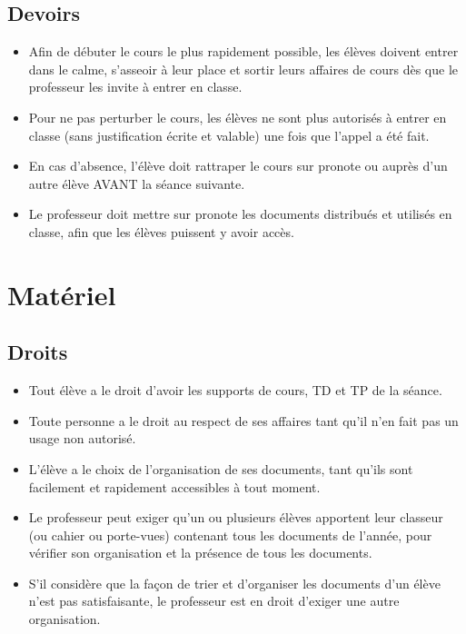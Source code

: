 \documentclass[10pt,fleqn]{article} %
\begin{document}
\subsection{Devoirs}
\begin{itemize}
    \item Afin de débuter le cours le plus rapidement possible, les élèves doivent entrer dans le calme, s'asseoir à leur place et sortir leurs affaires de cours dès que le professeur les invite à entrer en classe. 
    \item Pour ne pas perturber le cours, les élèves ne sont plus autorisés à entrer en classe (sans justification écrite et valable) une fois que l'appel a été fait. 
    \item En cas d'absence, l'élève doit rattraper le cours sur pronote ou auprès d'un autre élève AVANT la séance suivante. 
    \item Le professeur doit mettre sur pronote les documents distribués et utilisés en classe, afin que les élèves puissent y avoir accès. 
\end{itemize}

\section{Matériel}
\subsection{Droits}
\begin{itemize}
    \item Tout élève a le droit d'avoir les supports de cours, TD et TP de la séance. 
    \item Toute personne a le droit au respect de ses affaires tant qu'il n'en fait pas un usage non autorisé.
    \item L'élève a le choix de l'organisation de ses documents, tant qu'ils sont facilement et rapidement accessibles à tout moment. 
    \item Le professeur peut exiger qu'un ou plusieurs élèves apportent leur classeur (ou cahier ou porte-vues) contenant tous les documents de l'année, pour vérifier son organisation et la présence de tous les documents. 
    \item S'il considère que la façon de trier et d'organiser les documents d'un élève n'est pas satisfaisante, le professeur est en droit d'exiger une autre organisation. 
\end{itemize}
\end{document}
